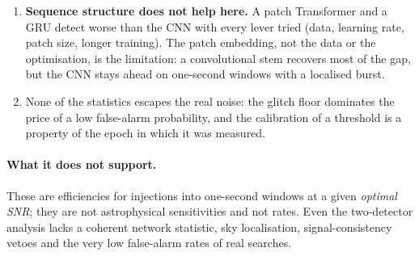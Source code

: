 \begin{enumerate}[nosep]
\item \textbf{Sequence structure does not help here.} A patch Transformer and a GRU detect worse than the CNN with every lever tried (data, learning rate, patch size, longer training). The patch embedding, not the data or the optimisation, is the limitation: a convolutional stem recovers most of the gap, but the CNN stays ahead on one-second windows with a localised burst.
\item None of the statistics escapes the real noise: the glitch floor dominates the price of a low false-alarm probability, and the calibration of a threshold is a property of the epoch in which it was measured.
\end{enumerate}

\paragraph{What it does not support.} These are efficiencies for injections into one-second windows at a given \emph{optimal SNR}; they are not astrophysical sensitivities and not rates. Even the two-detector analysis lacks a coherent network statistic, sky localisation, signal-consistency vetoes and the very low false-alarm rates of real searches.

